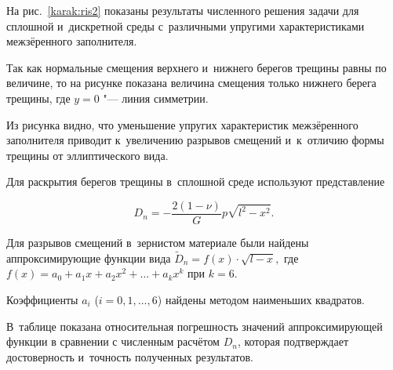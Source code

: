 На рис.~\ref{karak:ris2} показаны результаты численного решения задачи для сплошной и~дискретной среды с~различными упругими характеристиками межзёренного заполнителя. 

Так как нормальные смещения верхнего и~нижнего берегов трещины равны по величине, то на рисунке показана величина смещения только нижнего берега трещины, где $y=0$ "--- линия симметрии. 

Из рисунка видно, что уменьшение упругих характеристик межзёренного заполнителя приводит к~увеличению разрывов смещений и~к~отличию  формы трещины от эллиптического вида.





















Для раскрытия берегов трещины в~сплошной среде используют представление  

$$D_{n}=-\frac{2(1-\nu)}{G}p\sqrt{l^2-x^2}.$$ 

Для разрывов смещений в~зернистом материале были найдены аппроксимирующие функции вида $\tilde{D}_{n}=f(x)\cdot{\sqrt{l-x}},$ где $f(x)=a_{0}+a_{1} x+ a_{2} x^{2}+\dots+a_{k} x^{k}$ при \mbox{$k=6$}. 

Коэффициенты $a_{i}$ ($i=0, 1, \dots, 6$) найдены методом наименьших квадратов.

В~таблице  показана относительная погрешность   значений аппроксимирующей функции   в сравнении с численным расчётом $D_{n}$, которая подтверждает достоверность и~точность полученных результатов. 



